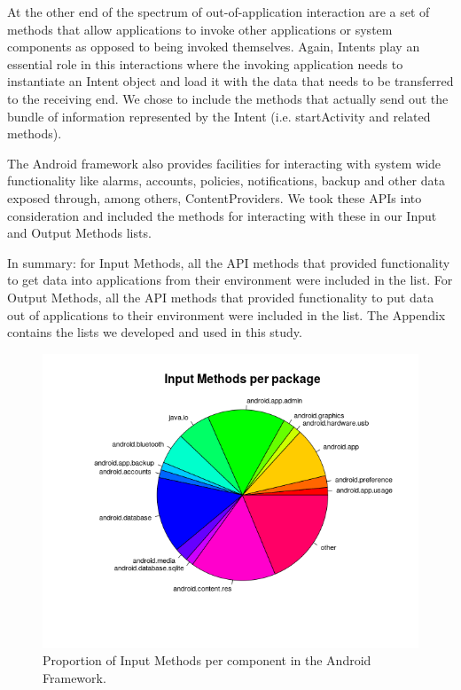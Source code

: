 \documentclass{sig-alternate}
\begin{document}
At the other end of the spectrum of out-of-application interaction are a set of methods that allow applications to invoke other applications or system components as opposed to being invoked themselves. Again, Intents play an essential role in this interactions where the invoking application needs to instantiate an Intent object and load it with the data that needs to be transferred to the receiving end. We chose to include the methods that actually send out the bundle of information represented by the Intent (i.e. startActivity and related methods).

The Android framework also provides facilities for interacting with system wide functionality like alarms, accounts, policies, notifications, backup and other data exposed through, among others, ContentProviders. We took these APIs into consideration and included the methods for interacting with these in our Input and Output Methods lists.

In summary: for Input Methods, all the API methods that provided functionality to get data into applications from their environment were included in the list. For Output Methods, all the API methods that provided functionality to put data out of applications to their environment were included in the list. The Appendix contains the lists we developed and used in this study.

\begin{figure}
  \centering
  \includegraphics[scale=0.40]{figs/input_methods_per_package.png}
  \caption{Proportion of Input Methods per component in the Android Framework.}
  \label{fig:input_methods_per_package}
\end{figure}
\end{document}

